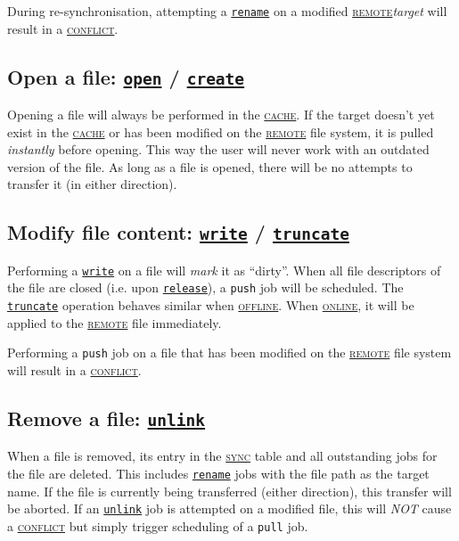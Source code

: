 \documentclass[a4paper]{article}
\newcommand{\keyword}[1]{\hyperref[keyword:#1]{\textsc{#1}}\xspace}
\newcommand{\sync}{\keyword{sync}}
\newcommand{\cache}{\keyword{cache}}
\newcommand{\remote}{\keyword{remote}}
\newcommand{\online}{\keyword{online}}
\newcommand{\offline}{\keyword{offline}}
\newcommand{\conflict}{\keyword{conflict}}
\newcommand{\fsopref}[1]{\hyperref[fsop:#1]{\texttt{#1}}}
\begin{document}
During re-synchronisation, attempting a \fsopref{rename} on a modified
\remote \emph{target} will result in a \conflict.

\subsection{Open a file: \fsopref{open} / \fsopref{create}} %
Opening a file will always be performed in the \cache. If the target doesn't yet
exist in the \cache or has been modified on the \remote file system, it is
pulled \emph{instantly} before opening. This way the user will never work with
an outdated version of the file.
As long as a file is opened, there will be no attempts to transfer it (in
either direction).

\subsection{Modify file content: \fsopref{write} / \fsopref{truncate}} %
Performing a \fsopref{write} on a file will \emph{mark} it as ``dirty''. When
all file descriptors of the file are closed (i.e. upon \fsopref{release}), a
\texttt{push} job will be scheduled.
The \fsopref{truncate} operation behaves similar when \offline. When \online,
it will be applied to the \remote file immediately.

Performing a \texttt{push} job on a file that has been modified on the \remote
file system will result in a \conflict.

\subsection{Remove a file: \fsopref{unlink}} %
When a file is removed, its entry in the \sync table and all outstanding jobs
for the file are deleted. This includes \fsopref{rename} jobs with the file path
as the target name. If the file is currently being transferred (either
direction), this transfer will be aborted.
If an \fsopref{unlink} job is attempted on a modified file, this will \emph{NOT}
cause a \conflict but simply trigger scheduling of a \texttt{pull} job.

\end{document}
